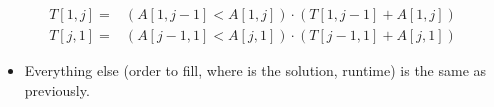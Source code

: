 \begin{align*}
T[1,j] =& (A[1, j-1] < A[1,j]) \cdot{} (T[1, j-1] + A[1,j]) \\
T[j,1] =& (A[j-1, 1] < A[j,1]) \cdot{} (T[j-1, 1] + A[j,1])
\end{align*}

\begin{itemize}
    \item Everything else (order to fill, where is the solution, runtime) is the same as previously.
\end{itemize}
